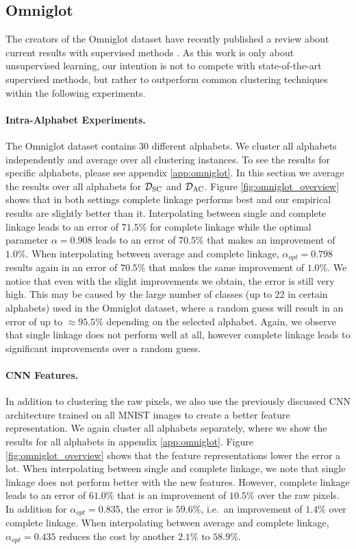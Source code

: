 \subsection{Omniglot}

The creators of the Omniglot dataset have recently published a review about current results with supervised methods \cite{DBLP:journals/corr/abs-1902-03477}. As this work is only about unsupervised learning, our intention is not to compete with state-of-the-art supervised methods, but rather to outperform common clustering techniques within the following experiments.

\paragraph{Intra-Alphabet Experiments.} The Omniglot dataset contains 30 different alphabets. We cluster all alphabets independently and average over all clustering instances. To see the results for specific alphabets, please see appendix \ref{app:omniglot}. In this section we average the results over all alphabets for $\mathcal{D}_\text{SC}$ and $\mathcal{D}_\text{AC}$. Figure \ref{fig:omniglot_overview} shows that in both settings complete linkage performs best and our empirical results are slightly better than it. Interpolating between single and complete linkage leads to an error of $71.5\%$ for complete linkage while the optimal parameter $\alpha = 0.908$ leads to an error of $70.5\%$ that makes an improvement of $1.0\%$. When interpolating between average and complete linkage, $\alpha_{opt} = 0.798$ results again in an error of $70.5\%$ that makes the  same improvement of $1.0\%$. We notice that even with the slight improvements we obtain, the error is still very high. This may be caused by the large number of classes (up to 22 in certain alphabets) used in the Omniglot dataset, where a random guess will result in an error of up to $\approx 95.5\%$ depending on the selected alphabet. Again, we observe that single linkage does not perform well at all, however complete linkage leads to significant improvements over a random guess.

\paragraph{CNN Features.} In addition to clustering the raw pixels, we also use the previously discussed CNN architecture trained on all MNIST images to create a better feature representation. We again cluster all alphabets separately, where we show the results for all alphabets in appendix \ref{app:omniglot}. Figure \ref{fig:omniglot_overview} shows that the feature representations lower the error a lot. When interpolating between single and complete linkage, we note that single linkage does not perform better with the new features. However, complete linkage leads to an error of $61.0\%$ that is an improvement of $10.5\%$ over the raw pixels. In addition for $\alpha_{opt} = 0.835$, the error is $59.6\%$, i.e.\ an improvement of $1.4\%$ over complete linkage. When interpolating between average and complete linkage, $\alpha_{opt} = 0.435$ reduces the cost by another $2.1\%$ to $58.9\%$.

